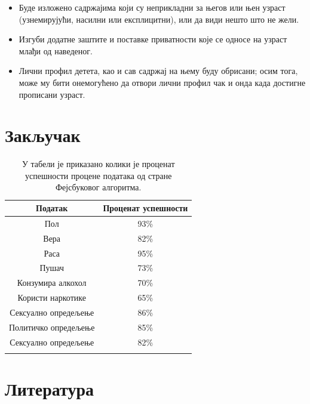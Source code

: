 \documentclass[a4paper]{article}
\begin{document}
\begin{itemize}


\item	Буде изложено садржајима који су неприкладни за његов или њен узраст (узнемирујући, насилни или експлицитни), или да види нешто што не жели.

\item	Изгуби додатне заштите и поставке приватности које се односе на узраст млађи од наведеног.

\item	Лични профил детета, као и сав садржај на њему буду обрисани; осим тога, може му бити онемогућено да отвори лични профил чак и онда када достигне прописани узраст.

\end{itemize}

\section{Закључак}

\begin{table}[h!]
\begin{center}


\begin{tabular}{|c|c|} \hline
\textbf{Податак} &\textbf{Проценат успешности}\\ \hline
Пол &93\% \\ \hline
Вера &82\%\\ \hline
Раса & 95\%\\ \hline
Пушач &73\% \\ \hline
Конзумира алкохол &70\% \\ \hline
Користи наркотике & 65\% \\ \hline
Сексуално опредељење &86\% \\ \hline
Политичко опредељење &85\% \\ \hline
Сексуално опредељење &82\% \\ \hline
\caption{У табели је приказано колики је проценат успешности процене података од стране Фејсбуковог алгоритма.}


\end{tabular}
\label{tab:tabela1}
\end{center}
\end{table}

\section{Литература}
\end{document}
